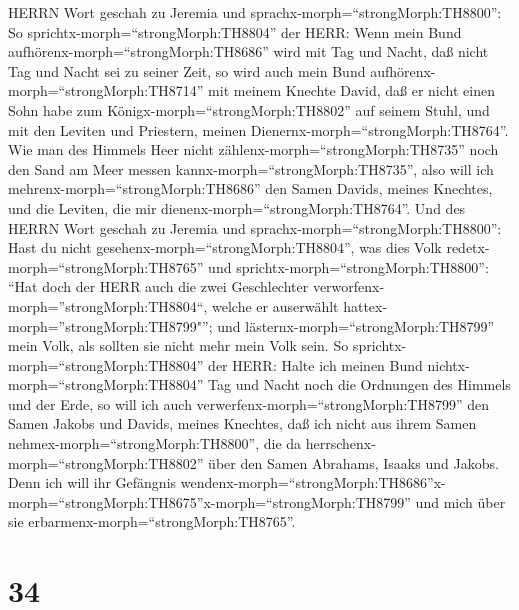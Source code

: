 HERRN Wort geschah zu Jeremia und sprachx-morph=``strongMorph:TH8800'':
 So sprichtx-morph=``strongMorph:TH8804'' der HERR: Wenn
mein Bund aufhörenx-morph=``strongMorph:TH8686'' wird mit Tag und Nacht,
daß nicht Tag und Nacht sei zu seiner Zeit,  so wird auch
mein Bund aufhörenx-morph=``strongMorph:TH8714'' mit meinem Knechte
David, daß er nicht einen Sohn habe zum
Königx-morph=``strongMorph:TH8802'' auf seinem Stuhl, und mit den
Leviten und Priestern, meinen Dienernx-morph=``strongMorph:TH8764''.
 Wie man des Himmels Heer nicht
zählenx-morph=``strongMorph:TH8735'' noch den Sand am Meer messen
kannx-morph=``strongMorph:TH8735'', also will ich
mehrenx-morph=``strongMorph:TH8686'' den Samen Davids, meines Knechtes,
und die Leviten, die mir dienenx-morph=``strongMorph:TH8764''.
 Und des HERRN Wort geschah zu Jeremia und
sprachx-morph=``strongMorph:TH8800'':  Hast du nicht
gesehenx-morph=``strongMorph:TH8804'', was dies Volk
redetx-morph=``strongMorph:TH8765'' und
sprichtx-morph=``strongMorph:TH8800'': ``Hat doch der HERR auch die zwei
Geschlechter verworfenx-morph=''strongMorph:TH8804``, welche er
auserwählt hattex-morph=''strongMorph:TH8799"''; und
lästernx-morph=``strongMorph:TH8799'' mein Volk, als sollten sie nicht
mehr mein Volk sein.  So
sprichtx-morph=``strongMorph:TH8804'' der HERR: Halte ich meinen Bund
nichtx-morph=``strongMorph:TH8804'' Tag und Nacht noch die Ordnungen des
Himmels und der Erde,  so will ich auch
verwerfenx-morph=``strongMorph:TH8799'' den Samen Jakobs und Davids,
meines Knechtes, daß ich nicht aus ihrem Samen
nehmex-morph=``strongMorph:TH8800'', die da
herrschenx-morph=``strongMorph:TH8802'' über den Samen Abrahams, Isaaks
und Jakobs. Denn ich will ihr Gefängnis
wendenx-morph=``strongMorph:TH8686''\textbar x-morph=``strongMorph:TH8675''x-morph=``strongMorph:TH8799''
und mich über sie erbarmenx-morph=``strongMorph:TH8765''.

\hypertarget{section-33}{%
\section{34}\label{section-33}}

